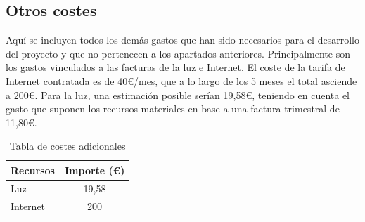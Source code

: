 \subsection{Otros costes}
Aquí se incluyen todos los demás gastos que han sido necesarios para el desarrollo del proyecto y que no pertenecen a los apartados anteriores. Principalmente son los gastos vinculados a las facturas de la luz e Internet. El coste de la tarifa de Internet contratada es de 40€/mes, que a lo largo de los 5 meses el total asciende a 200€. Para la luz, una estimación posible serían 19,58€, teniendo en cuenta el gasto que suponen los recursos materiales en base a una factura trimestral de 11,80€.

\begin{table}[ht]
    \centering
    \begin{tabular}[t]{lc}
        \toprule
        \textbf{Recursos} & \textbf{Importe (€)}  \\
        \midrule
        Luz         &   19,58   \\
        Internet    &   200      \\
        \bottomrule
    \end{tabular}
    \caption{Tabla de costes adicionales}
    \label{tabla:costes_adicionales}
\end{table}




